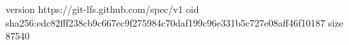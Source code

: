 version https://git-lfs.github.com/spec/v1
oid sha256:edc82fff238cb9c667ec9f275984c70daf199c96e331b5c727e08aff46f10187
size 87540
